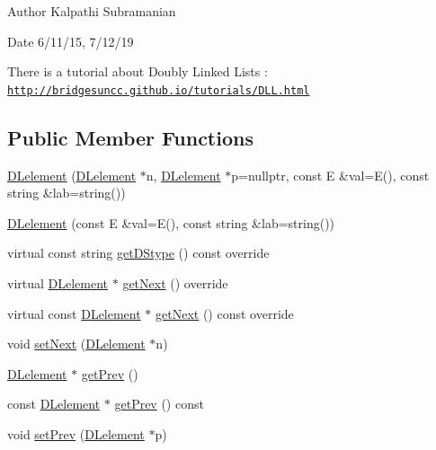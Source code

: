 \begin{DoxyAuthor}{Author}
Kalpathi Subramanian 
\end{DoxyAuthor}
\begin{DoxyDate}{Date}
6/11/15, 7/12/19
\end{DoxyDate}
There is a tutorial about Doubly Linked Lists \+: \href{http://bridgesuncc.github.io/tutorials/DLL.html}{\tt http\+://bridgesuncc.\+github.\+io/tutorials/\+D\+L\+L.\+html} \subsection*{Public Member Functions}
\begin{DoxyCompactItemize}
\item 
\hyperlink{classbridges_1_1datastructure_1_1_d_lelement_a7384d570c355bb4762c98b79d4c1e988}{D\+Lelement} (\hyperlink{classbridges_1_1datastructure_1_1_d_lelement}{D\+Lelement} $\ast$n, \hyperlink{classbridges_1_1datastructure_1_1_d_lelement}{D\+Lelement} $\ast$p=nullptr, const E \&val=E(), const string \&lab=string())
\item 
\hyperlink{classbridges_1_1datastructure_1_1_d_lelement_af9c0dc9b417de0466a47be904cd845f6}{D\+Lelement} (const E \&val=E(), const string \&lab=string())
\item 
virtual const string \hyperlink{classbridges_1_1datastructure_1_1_d_lelement_a736ba8e6901608fb0ab04d781d2cceee}{get\+D\+Stype} () const override
\item 
virtual \hyperlink{classbridges_1_1datastructure_1_1_d_lelement}{D\+Lelement} $\ast$ \hyperlink{classbridges_1_1datastructure_1_1_d_lelement_a63212051ea77d74bd751dea00288d2be}{get\+Next} () override
\item 
virtual const \hyperlink{classbridges_1_1datastructure_1_1_d_lelement}{D\+Lelement} $\ast$ \hyperlink{classbridges_1_1datastructure_1_1_d_lelement_a8599e5be5fc1771d4e8a40f6de67b4a7}{get\+Next} () const override
\item 
void \hyperlink{classbridges_1_1datastructure_1_1_d_lelement_ab0fe212dd0e3795b8f3f7978c6bdf805}{set\+Next} (\hyperlink{classbridges_1_1datastructure_1_1_d_lelement}{D\+Lelement} $\ast$n)
\item 
\hyperlink{classbridges_1_1datastructure_1_1_d_lelement}{D\+Lelement} $\ast$ \hyperlink{classbridges_1_1datastructure_1_1_d_lelement_ac0b2dd38b3e3acee503152c9aa88f61c}{get\+Prev} ()
\item 
const \hyperlink{classbridges_1_1datastructure_1_1_d_lelement}{D\+Lelement} $\ast$ \hyperlink{classbridges_1_1datastructure_1_1_d_lelement_a36120fa524459af75f7e8c1ae379ae20}{get\+Prev} () const
\item 
void \hyperlink{classbridges_1_1datastructure_1_1_d_lelement_a4bada3a954b68d2c4169b27b5b64ca97}{set\+Prev} (\hyperlink{classbridges_1_1datastructure_1_1_d_lelement}{D\+Lelement} $\ast$p)
\end{DoxyCompactItemize}
